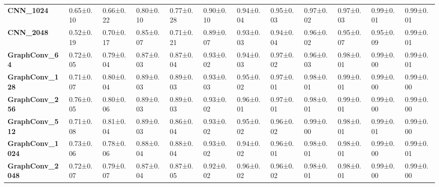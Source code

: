 \begin{tabular}{llllllllllll}
\textbf{CNN\_1024      } &   0.65±0.10 &  0.66±0.22 &  0.80±0.10 &  0.77±0.28 &  0.90±0.10 &  0.94±0.04 &  0.95±0.03 &  0.97±0.02 &  0.97±0.03 &   0.99±0.01 &   0.99±0.01 \\
\textbf{CNN\_2048      } &   0.52±0.19 &  0.70±0.17 &  0.85±0.07 &  0.71±0.21 &  0.89±0.07 &  0.93±0.03 &  0.94±0.04 &  0.96±0.02 &  0.95±0.07 &   0.95±0.09 &   0.99±0.01 \\
\textbf{GraphConv\_64  } &   0.72±0.05 &  0.79±0.04 &  0.87±0.03 &  0.87±0.04 &  0.93±0.02 &  0.94±0.03 &  0.97±0.02 &  0.96±0.03 &  0.98±0.01 &   0.99±0.00 &   0.99±0.01 \\
\textbf{GraphConv\_128 } &   0.71±0.07 &  0.80±0.04 &  0.89±0.03 &  0.89±0.03 &  0.93±0.03 &  0.95±0.02 &  0.97±0.01 &  0.98±0.01 &  0.99±0.01 &   0.99±0.00 &   0.99±0.00 \\
\textbf{GraphConv\_256 } &   0.76±0.05 &  0.80±0.06 &  0.89±0.03 &  0.89±0.03 &  0.93±0.02 &  0.96±0.01 &  0.97±0.01 &  0.98±0.01 &  0.99±0.01 &   0.99±0.00 &   0.99±0.00 \\
\textbf{GraphConv\_512 } &   0.71±0.08 &  0.81±0.04 &  0.89±0.03 &  0.86±0.04 &  0.93±0.02 &  0.95±0.02 &  0.96±0.02 &  0.99±0.00 &  0.98±0.01 &   0.99±0.01 &   0.99±0.00 \\
\textbf{GraphConv\_1024} &   0.73±0.06 &  0.78±0.06 &  0.88±0.04 &  0.88±0.04 &  0.93±0.02 &  0.94±0.02 &  0.96±0.01 &  0.98±0.01 &  0.98±0.01 &   0.99±0.00 &   0.99±0.01 \\
\textbf{GraphConv\_2048} &   0.72±0.07 &  0.79±0.07 &  0.87±0.04 &  0.87±0.05 &  0.92±0.02 &  0.96±0.02 &  0.96±0.02 &  0.98±0.01 &  0.98±0.01 &   0.99±0.00 &   0.99±0.00 \\
\bottomrule
\end{tabular}
